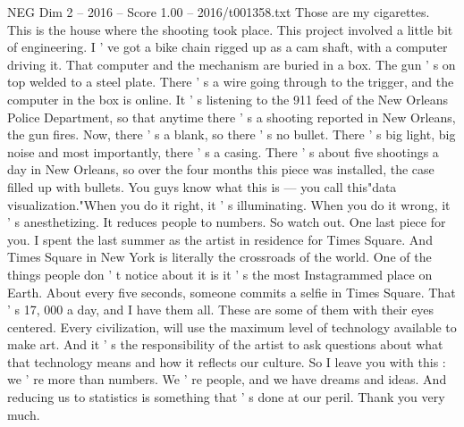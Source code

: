 \begin{textsample}{NEG Dim 2 – 2016 – Score 1.00 – 2016/t001358.txt}
Those are my cigarettes.
This is the house where the shooting took place.
This project involved a little bit of engineering.
I ' ve got a bike chain rigged up as a cam shaft, with a computer driving it.
That computer and the mechanism are buried in a box.
The gun ' s on top welded to a steel plate.
There ' s a wire going through to the trigger, and the computer in the box is online.
It ' s listening to the 911 feed of the New Orleans Police Department, so that anytime there ' s a shooting reported in New Orleans, the gun fires.
Now, there ' s a blank, so there ' s no bullet.
There ' s big light, big noise and most importantly, there ' s a casing.
There ' s about five shootings a day in New Orleans, so over the four months this piece was installed, the case filled up with bullets.
You guys know what this is — you call this"data visualization."When you do it right, it ' s illuminating.
When you do it wrong, it ' s anesthetizing.
It reduces people to numbers.
So watch out.
One last piece for you.
I spent the last summer as the artist in residence for Times Square.
And Times Square in New York is literally the crossroads of the world.
One of the things people don ' t notice about it is it ' s the most Instagrammed place on Earth.
About every five seconds, someone commits a selfie in Times Square.
That ' s 17, 000 a day, and I have them all.
These are some of them with their eyes centered.
Every civilization, will use the maximum level of technology available to make art.
And it ' s the responsibility of the artist to ask questions about what that technology means and how it reflects our culture.
So I leave you with this : we ' re more than numbers.
We ' re people, and we have dreams and ideas.
And reducing us to statistics is something that ' s done at our peril.
Thank you very much.

\end{textsample}
